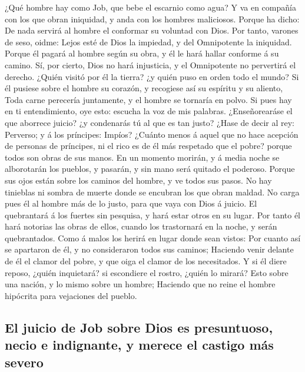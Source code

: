  ¿Qué hombre hay como Job, que bebe el escarnio como agua?
 Y va en compañía con los que obran iniquidad, y anda con
los hombres maliciosos.  Porque ha dicho: De nada servirá
al hombre el conformar su voluntad con Dios.  Por tanto,
varones de seso, oidme: Lejos esté de Dios la impiedad, y del
Omnipotente la iniquidad.  Porque él pagará al hombre
según su obra, y él le hará hallar conforme á su camino. 
Sí, por cierto, Dios no hará injusticia, y el Omnipotente no pervertirá
el derecho.  ¿Quién visitó por él la tierra? ¿y quién
puso en orden todo el mundo?  Si él pusiese sobre el
hombre su corazón, y recogiese así su espíritu y su aliento,
 Toda carne perecería juntamente, y el hombre se tornaría
en polvo.  Si pues hay en ti entendimiento, oye esto:
escucha la voz de mis palabras.  ¿Enseñorearáse el que
aborrece juicio? ¿y condenarás tú al que es tan justo? 
¿Hase de decir al rey: Perverso; y á los príncipes: Impíos?
 ¿Cuánto menos á aquel que no hace acepción de personas
de príncipes, ni el rico es de él más respetado que el pobre? porque
todos son obras de sus manos.  En un momento morirán, y á
media noche se alborotarán los pueblos, y pasarán, y sin mano será
quitado el poderoso.  Porque sus ojos están sobre los
caminos del hombre, y ve todos sus pasos.  No hay
tinieblas ni sombra de muerte donde se encubran los que obran maldad.
 No carga pues él al hombre más de lo justo, para que
vaya con Dios á juicio.  El quebrantará á los fuertes sin
pesquisa, y hará estar otros en su lugar.  Por tanto él
hará notorias las obras de ellos, cuando los trastornará en la noche, y
serán quebrantados.  Como á malos los herirá en lugar
donde sean vistos:  Por cuanto así se apartaron de él, y
no consideraron todos sus caminos;  Haciendo venir
delante de él el clamor del pobre, y que oiga el clamor de los
necesitados.  Y si él diere reposo, ¿quién inquietará? si
escondiere el rostro, ¿quién lo mirará? Esto sobre una nación, y lo
mismo sobre un hombre;  Haciendo que no reine el hombre
hipócrita para vejaciones del pueblo.

\hypertarget{el-juicio-de-job-sobre-dios-es-presuntuoso-necio-e-indignante-y-merece-el-castigo-muxe1s-severo}{%
\subsection{El juicio de Job sobre Dios es presuntuoso, necio e
indignante, y merece el castigo más
severo}\label{el-juicio-de-job-sobre-dios-es-presuntuoso-necio-e-indignante-y-merece-el-castigo-muxe1s-severo}}


